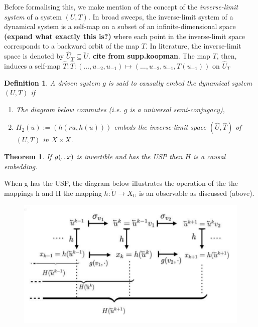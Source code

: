 \documentclass[12 pt]{article}
\newtheorem{Definition}{Definition}[]
\newtheorem{Theorem}{Theorem}[]
\begin{document}
  Before formalising this, we make mention of the concept of the \emph{inverse-limit system} of a system $(U,T)$. In broad sweeps, the inverse-limit system of a dynamical system is a self-map on a subset of an infinite-dimensional space \textbf{(expand what exactly this is?)} where each point in the inverse-limit space corresponds to a backward orbit of the map $T$. In literature, the inverse-limit space is denoted by $\hat{U}_T\subseteq\overleftarrow{U}$. \textbf{cite from supp.koopman}. 
  The map $T$, then, induces a self-map $\hat{T}:\widehat{T}: (\ldots,u_{-2},u_{-1}) \mapsto  (\ldots,u_{-2},u_{-1},T(u_{-1}))$ on $\widehat{U}_T$

\begin{Definition}
  A driven system $g$ is said to causally embed the dynamical system $(U,T)$ if 
  \vspace{-8mm}
\begin{enumerate}[noitemsep, label=\roman*.]
  \item The diagram below commutes (i.e. $g$ is a universal semi-conjugacy),
  \item $H_2(\overline{u}):=(h(r\overline{u}, h(\overline{u})))$ embeds the inverse-limit space $(\hat{U}, \hat{T})$ of $(U,T)$ in $X\times{X}$.
\end{enumerate}
\end{Definition}


\begin{Theorem}
 If $g(\ldotp,x)$ is invertible and has the USP then $H$ is a causal embedding. 
\end{Theorem}

When g has the USP, the diagram below illustrates the operation of the the mappings h and H the mapping $h:\overleftarrow{U}\to{X_U}$ is an observable as discussed (above).  

\begin{figure}[ht]
  \includegraphics[scale=0.3]{actionofh_H.png}
  \centering
  \label{fig:actionh_H}
\end{figure}
\end{document}
